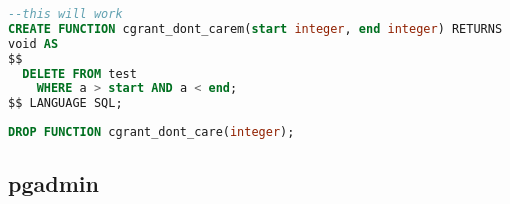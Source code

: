 \documentclass[12pt]{article}
\begin{document}
\begin{lstlisting}[language=sql, caption=function with a range (properly
  defined)]
--this will work
CREATE FUNCTION cgrant_dont_carem(start integer, end integer) RETURNS
void AS
$$
  DELETE FROM test
    WHERE a > start AND a < end;
$$ LANGUAGE SQL;
\end{lstlisting}

\begin{lstlisting}[language=sql, caption=delete function]
  DROP FUNCTION cgrant_dont_care(integer);
\end{lstlisting}

\subsection{pgadmin}
\end{document}
